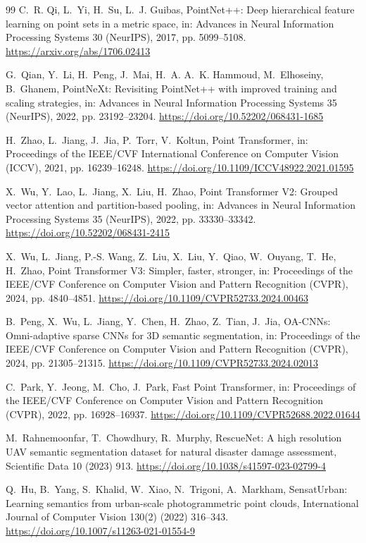 \documentclass[5p]{elsarticle}
\begin{document}
\begin{thebibliography}{99}
 C.~R. Qi, L.~Yi, H.~Su, L.~J. Guibas, PointNet++: Deep hierarchical feature learning on point sets in a metric space, in: Advances in Neural Information Processing Systems 30 (NeurIPS), 2017, pp. 5099--5108. \url{https://arxiv.org/abs/1706.02413}

 G.~Qian, Y.~Li, H.~Peng, J.~Mai, H.~A. A.~K. Hammoud, M.~Elhoseiny, B.~Ghanem, PointNeXt: Revisiting PointNet++ with improved training and scaling strategies, in: Advances in Neural Information Processing Systems 35 (NeurIPS), 2022, pp. 23192--23204. \url{https://doi.org/10.52202/068431-1685}

 H.~Zhao, L.~Jiang, J.~Jia, P.~Torr, V.~Koltun, Point Transformer, in: Proceedings of the IEEE/CVF International Conference on Computer Vision (ICCV), 2021, pp. 16239--16248. \url{https://doi.org/10.1109/ICCV48922.2021.01595}

 X.~Wu, Y.~Lao, L.~Jiang, X.~Liu, H.~Zhao, Point Transformer V2: Grouped vector attention and partition-based pooling, in: Advances in Neural Information Processing Systems 35 (NeurIPS), 2022, pp. 33330--33342. \url{https://doi.org/10.52202/068431-2415}

 X.~Wu, L.~Jiang, P.-S. Wang, Z.~Liu, X.~Liu, Y.~Qiao, W.~Ouyang, T.~He, H.~Zhao, Point Transformer V3: Simpler, faster, stronger, in: Proceedings of the IEEE/CVF Conference on Computer Vision and Pattern Recognition (CVPR), 2024, pp. 4840--4851. \url{https://doi.org/10.1109/CVPR52733.2024.00463}

 B.~Peng, X.~Wu, L.~Jiang, Y.~Chen, H.~Zhao, Z.~Tian, J.~Jia, OA-CNNs: Omni-adaptive sparse CNNs for 3D semantic segmentation, in: Proceedings of the IEEE/CVF Conference on Computer Vision and Pattern Recognition (CVPR), 2024, pp. 21305--21315. \url{https://doi.org/10.1109/CVPR52733.2024.02013}

 C.~Park, Y.~Jeong, M.~Cho, J.~Park, Fast Point Transformer, in: Proceedings of the IEEE/CVF Conference on Computer Vision and Pattern Recognition (CVPR), 2022, pp. 16928--16937. \url{https://doi.org/10.1109/CVPR52688.2022.01644}

 M.~Rahnemoonfar, T.~Chowdhury, R.~Murphy, RescueNet: A high resolution UAV semantic segmentation dataset for natural disaster damage assessment, Scientific Data 10 (2023) 913. \url{https://doi.org/10.1038/s41597-023-02799-4}

 Q.~Hu, B.~Yang, S.~Khalid, W.~Xiao, N.~Trigoni, A.~Markham, SensatUrban: Learning semantics from urban-scale photogrammetric point clouds, International Journal of Computer Vision 130(2) (2022) 316--343. \url{https://doi.org/10.1007/s11263-021-01554-9}


\end{thebibliography}
\end{document}
